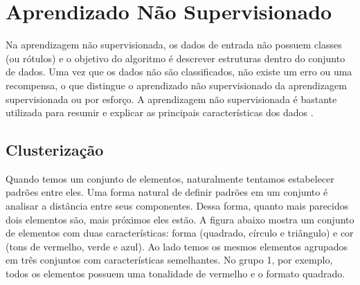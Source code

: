 \clearpage
\section{Aprendizado Não Supervisionado}

Na aprendizagem não supervisionada, os dados de entrada não possuem classes (ou rótulos) e o objetivo do algoritmo é descrever estruturas dentro do conjunto de dados. Uma vez que os dados não são classificados, não existe um erro ou uma recompensa, o que distingue o aprendizado não supervisionado da aprendizagem supervisionada ou por esforço. A aprendizagem não supervisionada é bastante utilizada para resumir e explicar as principais características dos dados \cite{jordan2004}.


\subsection{Clusterização}
\label{sec:clusterização}

Quando temos um conjunto de elementos, naturalmente tentamos estabelecer padrões entre eles. Uma forma natural de definir padrões em um conjunto é analisar a distância entre seus componentes. Dessa forma, quanto mais parecidos dois elementos são, mais próximos eles estão. A figura abaixo mostra um conjunto de elementos com duas características: forma (quadrado, círculo e triângulo) e cor (tons de vermelho, verde e azul). Ao lado temos os mesmos elementos agrupados em três conjuntos com características semelhantes. No grupo 1, por exemplo, todos os elementos possuem uma tonalidade de vermelho e o formato quadrado.

